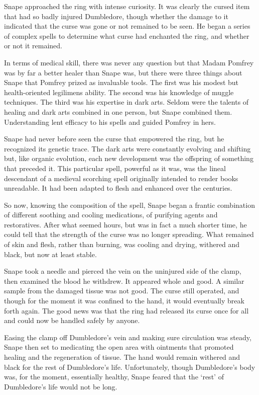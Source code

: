 \documentclass[a4paper,11pt]{article}
\begin{document}
Snape approached the ring with intense curiosity. It was clearly the cursed item that had so badly injured Dumbledore, though whether the damage to it indicated that the curse was gone or not remained to be seen. He began a series of complex spells to determine what curse had enchanted the ring, and whether or not it remained.

In terms of medical skill, there was never any question but that Madam Pomfrey was by far a better healer than Snape was, but there were three things about Snape that Pomfrey prized as invaluable tools. The first was his modest but health-oriented legilimens ability. The second was his knowledge of muggle techniques. The third was his expertise in dark arts. Seldom were the talents of healing and dark arts combined in one person, but Snape combined them. Understanding lent efficacy to his spells and guided Pomfrey in hers.

Snape had never before seen the curse that empowered the ring, but he recognized its genetic trace. The dark arts were constantly evolving and shifting but, like organic evolution, each new development was the offspring of something that preceded it. This particular spell, powerful as it was, was the lineal descendant of a medieval scorching spell originally intended to render books unreadable. It had been adapted to flesh and enhanced over the centuries.

So now, knowing the composition of the spell, Snape began a frantic combination of different soothing and cooling medications, of purifying agents and restoratives. After what seemed hours, but was in fact a much shorter time, he could tell that the strength of the curse was no longer spreading. What remained of skin and flesh, rather than burning, was cooling and drying, withered and black, but now at least stable.

Snape took a needle and pierced the vein on the uninjured side of the clamp, then examined the blood he withdrew. It appeared whole and good. A similar sample from the damaged tissue was not good. The curse still operated, and though for the moment it was confined to the hand, it would eventually break forth again. The good news was that the ring had released its curse once for all and could now be handled safely by anyone.

Easing the clamp off Dumbledore's vein and making sure circulation was steady, Snape then set to medicating the open area with ointments that promoted healing and the regeneration of tissue. The hand would remain withered and black for the rest of Dumbledore's life. Unfortunately, though Dumbledore's body was, for the moment, essentially healthy, Snape feared that the `rest' of Dumbledore's life would not be long.
\end{document}
